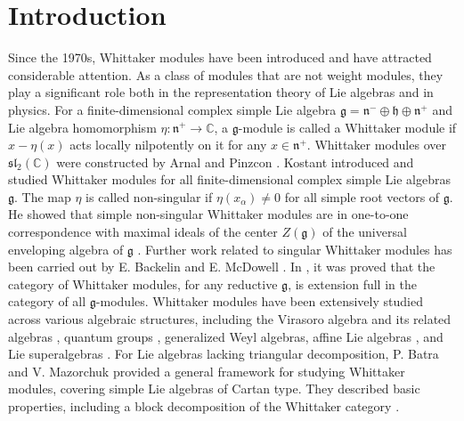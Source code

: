 \documentclass[12pt,a4paper]{amsart}
\def\mg{\mathfrak{g}}
\def\sl{\mathfrak{sl}}
\begin{document}
\section{Introduction}
Since the 1970s, Whittaker modules have been introduced and have attracted considerable attention. As a class of modules that are not weight modules, they play a significant role both in the representation theory of Lie algebras and in physics.
 For a finite-dimensional complex simple Lie algebra $\mg=\mathfrak{n}^{-} \oplus \mathfrak{h} \oplus \mathfrak{n}^{+}$ and Lie algebra homomorphism $\eta: \mathfrak{n}^{+} \rightarrow \mathbb{C}$, a $\mg$-module is called a Whittaker module if $x- \eta(x)$ acts locally nilpotently on it for any $x\in \mathfrak{n}^{+}$.
 Whittaker modules over $\sl_2(\mathbb{C})$ were constructed   by Arnal and Pinzcon \cite{DG}.
Kostant introduced and studied Whittaker modules  for all finite-dimensional complex simple Lie algebras $\mg$. The map $\eta$ is called non-singular if $\eta(x_{\alpha})\neq 0$ for all simple root vectors of $\mg$.
He showed that simple non-singular Whittaker modules are in one-to-one correspondence with maximal ideals of the center
 $Z(\mg)$ of the universal enveloping algebra of $\mg$ \cite{B}. Further work related to singular Whittaker modules has been carried out by E. Backelin \cite{EB} and E. McDowell \cite{EM}. In \cite{CM}, it was proved that the category of Whittaker modules, for any reductive $\mg$, is extension full in the category of all $\mg$-modules.
 Whittaker modules have been extensively studied across various algebraic structures, including the Virasoro algebra and its related algebras \cite{DYLX,DYL,ME,MOE,BW}, quantum groups \cite{MO,AS,LXJ}, generalized Weyl algebras\cite{GM}, affine Lie algebras \cite{CGLW,CJ,KC}, and Lie superalgebras \cite{C}. For Lie algebras lacking triangular decomposition,
 P. Batra and V. Mazorchuk provided a general framework for studying Whittaker modules, covering simple Lie algebras of Cartan type. They described basic properties, including a block decomposition of the Whittaker category \cite{PV}.
\end{document}
